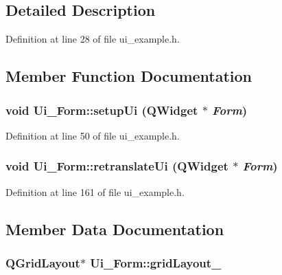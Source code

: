 \subsection{Detailed Description}


Definition at line 28 of file ui\_\-example.h.

\subsection{Member Function Documentation}
\hypertarget{classUi__Form_90f69afe5c674331bdf041a051aee259}{
\subsubsection{\setlength{\rightskip}{0pt plus 5cm}void Ui\_\-Form::setupUi (QWidget $\ast$ {\em Form})}}
\label{classUi__Form_90f69afe5c674331bdf041a051aee259}




Definition at line 50 of file ui\_\-example.h.\hypertarget{classUi__Form_d05dfdbcadce5efd8a7e8da759e41aa4}{
\subsubsection{\setlength{\rightskip}{0pt plus 5cm}void Ui\_\-Form::retranslateUi (QWidget $\ast$ {\em Form})}}
\label{classUi__Form_d05dfdbcadce5efd8a7e8da759e41aa4}




Definition at line 161 of file ui\_\-example.h.

\subsection{Member Data Documentation}
\hypertarget{classUi__Form_20492753521a4e9bde7f68c0a760bc7d}{
\subsubsection{\setlength{\rightskip}{0pt plus 5cm}QGridLayout$\ast$ {\bf Ui\_\-Form::gridLayout\_}}}
\label{classUi__Form_20492753521a4e9bde7f68c0a760bc7d}




